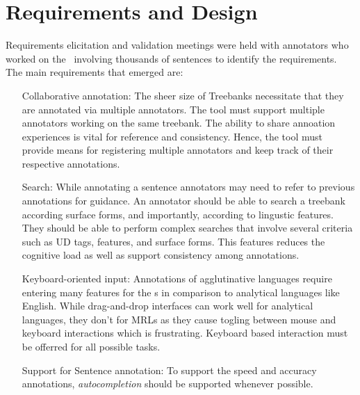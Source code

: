 \section{Requirements and Design}
\label{sec:requirements}


Requirements elicitation and validation meetings were held with annotators who worked on the  \bountreebank\ involving thousands of sentences to identify the requirements.
The main requirements that emerged are:
\begin{itemize}[before=\normalfont, font=\itshape, align=left]
    \item[Collaborative annotation:]
        The sheer size of Treebanks necessitate that they are annotated via multiple annotators. 
	The tool must support multiple annotators working on the same treebank. 
        The ability to share annoation experiences is vital for reference and consistency. 
        Hence, the tool must provide means for registering multiple annotators and keep track of their respective annotations. 
    \item[Search:]
	While annotating a sentence annotators may need to refer to previous annotations for guidance. 
        An annotator should be able to search a treebank according surface forms, and importantly, according to lingustic features. 
        They should be able to perform complex searches that involve several criteria such as UD tags, features, and surface forms.
	This features reduces the cognitive load as well as support consistency among annotations. 
    \item[Keyboard-oriented input:]
        Annotations of agglutinative languages require entering many features for the \form s in comparison to analytical languages like English.
        While drag-and-drop interfaces can work well for analytical languages, they don't for MRLs as they cause togling between mouse and keyboard interactions which is frustrating.
        Keyboard based interaction must be offerred for all possible tasks.
    \item[Support for Sentence annotation:]
	    To support the speed and accuracy annotations, \textit{autocompletion} should be supported whenever possible.  


\end{itemize}
